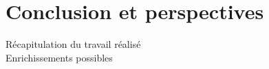 \chapter*{Conclusion et perspectives}
\label{sec:conclusion}

     	Récapitulation du travail réalisé\\[2cm]
 	    Enrichissements possibles

